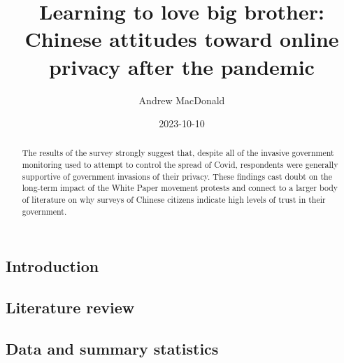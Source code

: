 \documentclass[
  letterpaper,
  DIV=11,
  numbers=noendperiod]{scrartcl}
\title{Learning to love big brother: Chinese attitudes toward online
privacy after the pandemic}
\author{Andrew MacDonald}
\date{2023-10-10}
\begin{document}
\maketitle
\begin{abstract}
The results of the survey strongly suggest that, despite all of the
invasive government monitoring used to attempt to control the spread of
Covid, respondents were generally supportive of government invasions of
their privacy. These findings cast doubt on the long-term impact of the
White Paper movement protests and connect to a larger body of literature
on why surveys of Chinese citizens indicate high levels of trust in
their government.
\end{abstract}
\ifdefined\Shaded\renewenvironment{Shaded}{\begin{tcolorbox}[borderline west={3pt}{0pt}{shadecolor}, enhanced, frame hidden, interior hidden, boxrule=0pt, breakable, sharp corners]}{\end{tcolorbox}}\fi

\hypertarget{introduction}{%
\subsection{Introduction}\label{introduction}}

\hypertarget{literature-review}{%
\subsection{Literature review}\label{literature-review}}

\hypertarget{sec-datasummary}{%
\subsection{Data and summary statistics}\label{sec-datasummary}}
\end{document}
